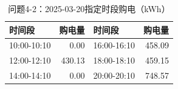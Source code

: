 \begin{table}[H]\centering\small\caption{问题4-2：2025-03-20指定时段购电（kWh）}\label{tab:q4_220250320p}
\begin{tabular}{lrlr}\toprule
时间段 & 购电量 & 时间段 & 购电量\\\midrule
10:00-10:10 & 0.00 & 16:00-16:10 & 458.09\\
12:00-12:10 & 430.13 & 18:00-18:10 & 459.15\\
14:00-14:10 & 0.00 & 20:00-20:10 & 748.57\\
\bottomrule\end{tabular}\end{table}
